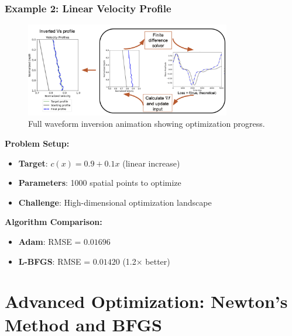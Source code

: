 \documentclass[notes]{beamer}
\begin{document}
\begin{frame}
\frametitle{Example 2: Linear Velocity Profile}

\begin{figure}[ht]
	\centering
	\includegraphics[width=0.8\textwidth]{figs/fwi-final.png}
	\caption*{Full waveform inversion animation showing optimization progress.}
\end{figure}

\textbf{Problem Setup:}
\begin{itemize}
    \item \textbf{Target}: $c(x) = 0.9 + 0.1x$ (linear increase)
    \item \textbf{Parameters}: 1000 spatial points to optimize
    \item \textbf{Challenge}: High-dimensional optimization landscape
\end{itemize}

\textbf{Algorithm Comparison:}
\begin{itemize}
    \item \textbf{Adam}: RMSE = $0.01696$
    \item \textbf{L-BFGS}: RMSE = $0.01420$ (1.2× better)
\end{itemize}

\end{frame}

\section{Advanced Optimization: Newton's Method and BFGS}
\end{document}
